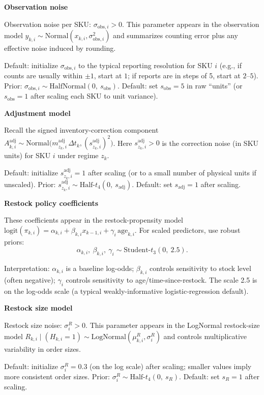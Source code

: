 \documentclass[11pt]{article}
\begin{document}
\textbf{Observation noise}

Observation noise per SKU: $\sigma_{\text{obs},i} > 0$.
This parameter appears in the observation model
$y_{k,i}\sim\text{Normal}(x_{k,i},\sigma^2_{\text{obs},i})$ and summarizes counting error plus any effective noise induced by rounding.

Default: initialize $\sigma_{\text{obs},i}$ to the typical reporting resolution for SKU $i$ (e.g., if counts are usually within $\pm 1$, start at $1$; if reports are in steps of 5, start at $2$--$5$).
Prior: $\sigma_{\text{obs},i} \sim \text{HalfNormal}(0,\ s_{\text{obs}})$.
Default: set $s_{\text{obs}}=5$ in raw ``units'' (or $s_{\text{obs}}=1$ after scaling each SKU to unit variance).

\textbf{Adjustment model}

Recall the signed inventory-correction component
$A^{\mathrm{adj}}_{k,i} \sim \text{Normal}\bigl(m^{\mathrm{adj}}_{z_k,i}\,\Delta t_k,(s^{\mathrm{adj}}_{z_k,i})^2\bigr)$.
Here $s^{\mathrm{adj}}_{z_k,i}>0$ is the correction noise (in SKU units) for SKU $i$ under regime $z_k$.

Default: initialize $s^{\mathrm{adj}}_{z_k,i}=1$ after scaling (or to a small number of physical units if unscaled).
Prior: $s^{\mathrm{adj}}_{z_k,i} \sim \text{Half-}t_{4}(0,\ s_{\text{adj}})$.
Default: set $s_{\text{adj}}=1$ after scaling.

\textbf{Restock policy coefficients}

These coefficients appear in the restock-propensity model
$\text{logit}(\pi_{k,i}) = \alpha_{k,i} + \beta_{k,i}x_{k-1,i} + \gamma_i\,\text{age}_{k,i}$.
For scaled predictors, use robust priors:
\[
  \alpha_{k,i},\ \beta_{k,i},\ \gamma_i \sim \text{Student-}t_{3}(0,\ 2.5).
\]

Interpretation: $\alpha_{k,i}$ is a baseline log-odds; $\beta_{k,i}$ controls sensitivity to stock level (often negative); $\gamma_i$ controls sensitivity to age/time-since-restock.
The scale 2.5 is on the log-odds scale (a typical weakly-informative logistic-regression default).

\textbf{Restock size model}

Restock size noise: $\sigma^{R}_i > 0$.
This parameter appears in the LogNormal restock-size model
$R_{k,i}\mid(H_{k,i}=1)\sim\text{LogNormal}(\mu^R_{k,i},\sigma^R_i)$ and controls multiplicative variability in order sizes.

Default: initialize $\sigma^{R}_i=0.3$ (on the log scale) after scaling; smaller values imply more consistent order sizes.
Prior: $\sigma^{R}_i \sim \text{Half-}t_{4}(0,\ s_R)$.
Default: set $s_R=1$ after scaling.
\end{document}
